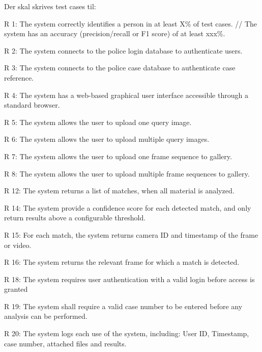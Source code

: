  \noindent \hrulefill




Der skal skrives test cases til:

R 1: The system correctly identifies a person in at least X\% of test cases. // The system has an accuracy (precision/recall or F1 score) of at least xxx\%. 

R 2:	The system connects to the police login database to authenticate users.

R 3:	The system connects to the police case database to authenticate case reference.

R 4:	The system has a web-based graphical user interface accessible through a standard browser.

R 5:	The system allows the user to upload one query image.

R 6:	The system allows the user to upload multiple query images.

R 7:	The system allows the user to upload one frame sequence to gallery.

R 8:	The system allows the user to upload multiple frame sequences to gallery.

R 12:	The system returns a list of matches, when all material is analyzed.	

R 14: The system provide a confidence score for each detected match, and only return results above a configurable threshold.

R 15:	For each match, the system returns camera ID and timestamp of the frame or video.

R 16:	The system returns the relevant frame for which a match is detected.

R 18: The system requires user authentication with a valid login before access is granted

R 19: The system shall require a valid case number to be entered before any analysis can be performed.

R 20: The system logs each use of the system, including: User ID, Timestamp, case number, attached files and results.



